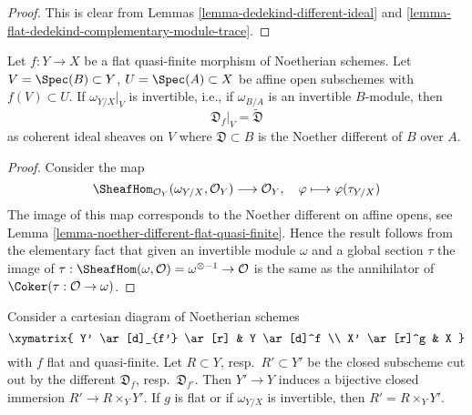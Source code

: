 \begin{proof}
This is clear from Lemmas \ref{lemma-dedekind-different-ideal} and
\ref{lemma-flat-dedekind-complementary-module-trace}.
\end{proof}

\begin{lemma}
\label{lemma-flat-gorenstein-agree-noether}
Let $f : Y \to X$ be a flat quasi-finite morphism of Noetherian schemes.
Let $V = \Spec(B) \subset Y$, $U = \Spec(A) \subset X$
be affine open subschemes with $f(V) \subset U$.
If $\omega_{Y/X}|_V$ is invertible, i.e., if $\omega_{B/A}$
is an invertible $B$-module, then
$$
\mathfrak{D}_f|_V = \widetilde{\mathfrak{D}}
$$
as coherent ideal sheaves on $V$ where
$\mathfrak{D} \subset B$ is the Noether different of $B$ over $A$.
\end{lemma}

\begin{proof}
Consider the map
$$
\SheafHom_{\mathcal{O}_Y}(\omega_{Y/X}, \mathcal{O}_Y)
\longrightarrow
\mathcal{O}_Y,\quad
\varphi \longmapsto \varphi(\tau_{Y/X})
$$
The image of this map corresponds to the Noether different
on affine opens, see Lemma \ref{lemma-noether-different-flat-quasi-finite}.
Hence the result follows from the elementary fact that given
an invertible module $\omega$ and a global section $\tau$
the image of
$\tau : \SheafHom(\omega, \mathcal{O}) = \omega^{\otimes -1} \to \mathcal{O}$
is the same as the annihilator of $\Coker(\tau : \mathcal{O} \to \omega)$.
\end{proof}

\begin{lemma}
\label{lemma-base-change-different}
Consider a cartesian diagram of Noetherian schemes
$$
\xymatrix{
Y' \ar[d]_{f'} \ar[r] & Y \ar[d]^f \\
X' \ar[r]^g & X
}
$$
with $f$ flat and quasi-finite. Let $R \subset Y$, resp.\ $R' \subset Y'$
be the closed subscheme cut out by the different
$\mathfrak{D}_f$, resp.\ $\mathfrak{D}_{f'}$.
Then $Y' \to Y$ induces a bijective closed immersion $R' \to R \times_Y Y'$.
If $g$ is flat or if $\omega_{Y/X}$ is invertible, then
$R' = R \times_Y Y'$.
\end{lemma}

